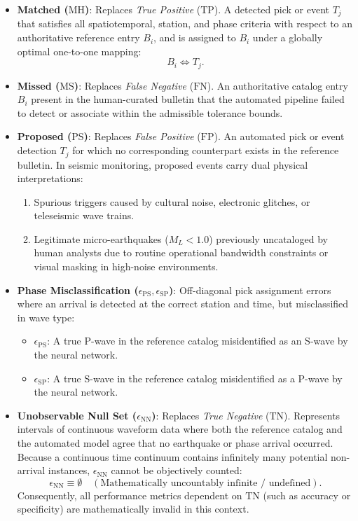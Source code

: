 \begin{itemize}
  \item \textbf{Matched ($\mathrm{MH}$)}: Replaces \textit{True Positive} ($\mathrm{TP}$). A detected pick or event $T_j$ that satisfies all spatiotemporal, station, and phase criteria with respect to an authoritative reference entry $B_i$, and is assigned to $B_i$ under a globally optimal one-to-one mapping:
  \begin{equation}
    B_i \Longleftrightarrow T_j.
  \end{equation}
  \item \textbf{Missed ($\mathrm{MS}$)}: Replaces \textit{False Negative} ($\mathrm{FN}$). An authoritative catalog entry $B_i$ present in the human-curated bulletin that the automated pipeline failed to detect or associate within the admissible tolerance bounds.
  \item \textbf{Proposed ($\mathrm{PS}$)}: Replaces \textit{False Positive} ($\mathrm{FP}$). An automated pick or event detection $T_j$ for which no corresponding counterpart exists in the reference bulletin. In seismic monitoring, proposed events carry dual physical interpretations:
  \begin{enumerate}
    \item Spurious triggers caused by cultural noise, electronic glitches, or teleseismic wave trains.
    \item Legitimate micro-earthquakes ($M_L < 1.0$) previously uncataloged by human analysts due to routine operational bandwidth constraints or visual masking in high-noise environments.
  \end{enumerate}
  \item \textbf{Phase Misclassification ($\epsilon_{\mathrm{PS}}, \epsilon_{\mathrm{SP}}$)}: Off-diagonal pick assignment errors where an arrival is detected at the correct station and time, but misclassified in wave type:
  \begin{itemize}
    \item $\epsilon_{\mathrm{PS}}$: A true P-wave in the reference catalog misidentified as an S-wave by the neural network.
    \item $\epsilon_{\mathrm{SP}}$: A true S-wave in the reference catalog misidentified as a P-wave by the neural network.
  \end{itemize}
  \item \textbf{Unobservable Null Set ($\epsilon_{\mathrm{NN}}$)}: Replaces \textit{True Negative} ($\mathrm{TN}$). Represents intervals of continuous waveform data where both the reference catalog and the automated model agree that no earthquake or phase arrival occurred. Because a continuous time continuum contains infinitely many potential non-arrival instances, $\epsilon_{\mathrm{NN}}$ cannot be objectively counted:
  \begin{equation}
    \epsilon_{\mathrm{NN}} \equiv \emptyset \quad (\text{Mathematically uncountably infinite / undefined}).
  \end{equation}
  Consequently, all performance metrics dependent on $\mathrm{TN}$ (such as accuracy or specificity) are mathematically invalid in this context.
\end{itemize}

